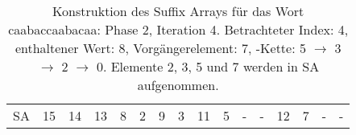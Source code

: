 \begin{table}[H]
\begin{adjustbox}{max width=\textwidth}
\begin{tabular}{lccccccccccccccc}
\multicolumn{1}{l|}{SA}      & \multicolumn{1}{c|}{15} & 14 & \multicolumn{1}{c|}{13} & \multicolumn{1}{c|}{\cellcolor[HTML]{\green}8} & \multicolumn{1}{c|}{\cellcolor[HTML]{\red}2} & \multicolumn{1}{c|}{9}    & \multicolumn{1}{c|}{\cellcolor[HTML]{\red}3} & \multicolumn{1}{c|}{11} & \multicolumn{1}{c|}{\cellcolor[HTML]{\red}5} & -  & \multicolumn{1}{c|}{-}  & 12 & \cellcolor[HTML]{\red}7 & -  & - 
\end{tabular}
\end{adjustbox}

\caption[Konstruktion des Suffix Arrays f{\"u}r das Wort caabaccaabacaa: Phase 2, Iteration 4]{Konstruktion des Suffix Arrays f{\"u}r das Wort caabaccaabacaa: Phase 2, Iteration 4. Betrachteter Index: 4, enthaltener Wert: 8, Vorg{\"a}ngerelement: 7, \prevpointer-Kette: 5 $\rightarrow$ 3 $\rightarrow$ 2 $\rightarrow$ 0. Elemente 2, 3, 5 und 7 werden in SA aufgenommen.}
\label{table_complex_example_2_4} 
\end{table}

